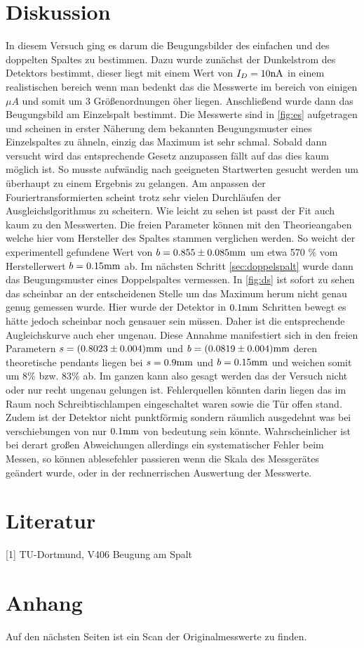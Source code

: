 \section{Diskussion}
\label{sec:diskussion}
In diesem Versuch ging es darum die Beugungsbilder des einfachen und des doppelten Spaltes zu bestimmen.
Dazu wurde zunächst der Dunkelstrom des Detektors bestimmt, dieser liegt mit einem Wert von $I_D=10\si[]{nA}$
in einem realistischen bereich wenn man bedenkt das die Messwerte im bereich von einigen $\mu A$ und somit um
3 Größenordnungen öher liegen. Anschließend wurde dann das Beugungsbild am Einzelspalt bestimmt. Die Messwerte
sind in \autoref{fig:es} aufgetragen und scheinen in erster Näherung dem bekannten Beugungsmuster eines Einzelspaltes
zu ähneln, einzig das Maximum ist sehr schmal. Sobald dann versucht wird das entsprechende Gesetz anzupassen 
fällt auf das dies kaum möglich ist. So musste aufwändig nach geeigneten Startwerten gesucht werden um überhaupt zu
einem Ergebnis zu gelangen. Am anpassen der Fouriertransformierten
scheint trotz sehr vielen Durchläufen der Ausgleichslgorithmus zu scheitern. 
Wie leicht zu sehen ist passt der Fit auch kaum zu den Messwerten. Die freien Parameter
können mit den Theorieangaben welche hier vom Hersteller des Spaltes stammen verglichen werden. So weicht
der experimentell gefundene Wert von $b=0.855\pm 0.085\si[]{mm}$ um etwa 570 \% vom Herstellerwert $b=0.15\si[]{mm}$
ab. Im nächsten Schritt \autoref{sec:doppelspalt} wurde dann das Beugungsmuster eines Doppelspaltes vermessen. 
In \autoref{fig:ds} ist sofort zu sehen das scheinbar an der entscheidenen Stelle um das Maximum herum nicht genau
genug gemessen wurde. Hier wurde der Detektor in $0.1\si[]{mm}$ Schritten bewegt es hätte jedoch scheinbar noch gensauer
sein müssen. Daher ist die entsprechende Augleichskurve auch eher ungenau. Diese Annahme manifestiert sich 
in den freien Parametern $s=(0.8023\pm 0.004)\si[]{mm}$ und $b=(0.0819\pm 0.004)\si[]{mm}$ deren theoretische pendants
liegen bei $s=0.9\si[]{mm}$ und $b=0.15\si[]{mm}$ und weichen somit um 8\% bzw. 83\% ab. Im ganzen kann 
also gesagt werden das der Versuch nicht oder nur recht ungenau gelungen ist. Fehlerquellen könnten darin liegen das
im Raum noch Schreibtischlampen eingeschaltet waren sowie die Tür offen stand. Zudem ist der Detektor nicht 
punktförmig sondern räumlich ausgedehnt was bei verschiebungen von nur $0.1\si[]{mm}$ von bedeutung sein könnte.
Wahrscheinlicher ist bei derart großen Abweichungen allerdings ein systematischer Fehler beim Messen, so können 
ablesefehler passieren wenn die Skala des Messgerätes geändert wurde, oder in der rechnerrischen Auswertung der
Messwerte.

\section{Literatur}
\label{sec:literatur}
[1] TU-Dortmund, V406 Beugung am Spalt

\section{Anhang}
\label{sec:Anhang}
Auf den nächsten Seiten ist ein Scan der Originalmesswerte zu finden.
